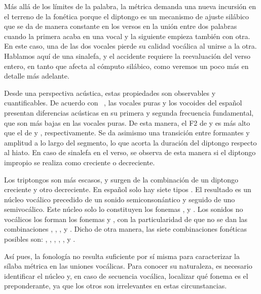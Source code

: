 Más allá de los límites de la palabra, la métrica demanda una nueva incursión en el terreno de la fonética porque el diptongo es un mecanismo de ajuste silábico que se da de manera constante en los versos en la unión entre dos palabras cuando la primera acaba en una vocal y la siguiente empieza también con otra. En este caso, una de las dos vocales pierde su calidad vocálica al unirse a la otra. Hablamos aquí de una sinalefa, y el accidente requiere la reevaluación del verso entero, en tanto que afecta al cómputo silábico, como veremos un poco más en detalle más adelante.

Desde una perspectiva acústica, estas propiedades son observables y cuantificables. De acuerdo con \citeauthor{milner2021}~\parencite*{milner2021}, las vocales puras y los vocoides del español presentan diferencias acústicas en su primera y segunda frecuencia fundamental, que son más bajas en las vocales puras. De esta manera, el F2 de \ipa{[i̯]} y \ipa{[u̯]} es más alto que el de \ipa{[i]} y \ipa{[u]}, respectivamente. Se da asimismo una transición entre formantes y amplitud  a lo largo del segmento, lo que acorta la duración del diptongo respecto al hiato. En caso de sinalefa en el verso, se observa de esta manera si el diptongo impropio se realiza como creciente o decreciente.



Los triptongos son más escasos, y surgen de la combinación de un diptongo creciente y otro decreciente. En español solo hay siete tipos \parencite{canellada1987}. El resultado es un núcleo vocálico precedido de un sonido semiconsonántico y seguido de uno semivocálico. Este núcleo solo lo constituyen los fonemas ,  y . Los sonidos no vocálicos los forman los fonemas  y , con la particularidad de que no se dan las combinaciones , , ,  y . Dicho de otra manera, las siete combinaciones fonéticas posibles son: \ipa{[jai̯]}, \ipa{[jei̯]}, \ipa{[joi̯]}, \ipa{[jau̯]}, \ipa{[wai̯]}, \ipa{[wei̯]} y \ipa{[wau̯]}.

Así pues, la fonología no resulta suficiente por sí misma para caracterizar la sílaba métrica en las uniones vocálicas. Para conocer su naturaleza, es necesario identificar el núcleo y, en caso de secuencia vocálica, localizar qué fonema es el preponderante, ya que los otros son irrelevantes en estas circunstancias.

